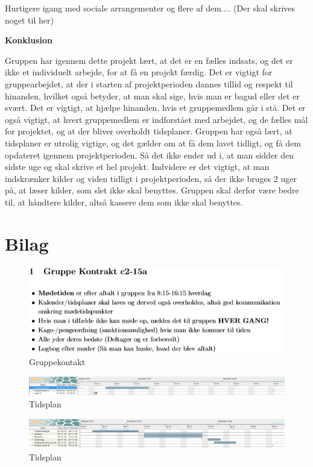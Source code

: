 Hurtigere igang med sociale arrangementer og flere af dem.... (Der skal skrives noget til her)

\newpage

\textbf{Konklusion}

Gruppen har igennem dette projekt lært, at det er en fælles indsats, og det er ikke et individuelt arbejde, for at få en projekt færdig. Det er vigtigt for gruppearbejdet, at der i starten af projektperioden dannes tillid og respekt til hinanden, hvilket også betyder, at man skal sige, hvis man er bagud eller det er svært. Det er vigtigt, at hjælpe hinanden, hvis et gruppemedlem går i stå. Det er også vigtigt, at hvert gruppemedlem er indforstået med arbejdet, og de fælles mål for projektet, og at der bliver overholdt tidsplaner.
Gruppen har også lært, at tidsplaner er utrolig vigtige, og det gælder om at få dem lavet tidligt, og få dem opdateret igennem projektperioden. Så det ikke ender ud i, at man sidder den sidste uge og skal skrive et hel projekt. Indvidere er det vigtigt, at man indskrænker kilder og viden tidligt i projektperioden, så der ikke bruges 2 uger på, at læser kilder, som slet ikke skal benyttes. Gruppen skal derfor være bedre til, at håndtere kilder, altså kassere dem som ikke skal benyttes.

\chapter{Bilag}

\begin{figure} [H]
\includegraphics[scale=1]{Gruppekontrakt}
\caption{Gruppekontakt}
\end{figure}

\begin{figure} [H]
\includegraphics[scale=0.35]{Tidsplan1}
\caption{Tidsplan}
\end{figure}

\begin{figure} [H]
\includegraphics[scale=0.35]{Tidsplan2}
\caption{Tidsplan}
\end{figure}

